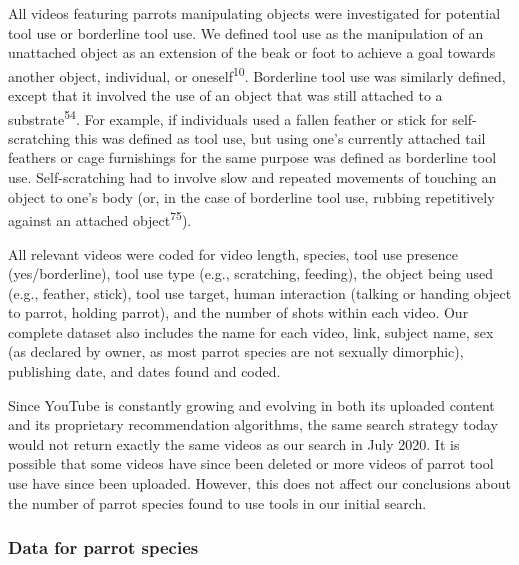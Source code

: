 \documentclass[
  man, donotrepeattitle,floatsintext]{apa6}
\begin{document}
All videos featuring parrots manipulating objects were investigated for
potential tool use or borderline tool use. We defined tool use as the
manipulation of an unattached object as an extension of the beak or foot to
achieve a goal towards another object, individual, or oneself\textsuperscript{10}.
Borderline tool use was similarly defined, except that it involved the use of an
object that was still attached to a substrate\textsuperscript{54}. For example, if
individuals used a fallen feather or stick for self-scratching this was defined
as tool use, but using one's currently attached tail feathers or cage
furnishings for the same purpose was defined as borderline tool use.
Self-scratching had to involve slow and repeated movements of touching an object
to one's body (or, in the case of borderline tool use, rubbing repetitively
against an attached object\textsuperscript{75}).

All relevant videos were coded for video length, species, tool use presence
(yes/borderline), tool use type (e.g., scratching, feeding), the object being
used (e.g., feather, stick), tool use target, human interaction
(talking or handing object to parrot, holding parrot), and the number of shots
within each video. Our complete dataset also includes the name for each video,
link, subject name, sex (as declared by owner, as most parrot species are not
sexually dimorphic), publishing date, and dates found and coded.

Since YouTube is constantly growing and evolving in both its uploaded content
and its proprietary recommendation algorithms, the same search strategy today
would not return exactly the same videos as our search in July 2020. It is
possible that some videos have since been deleted or more videos of parrot tool
use have since been uploaded. However, this does not affect our conclusions
about the number of parrot species found to use tools in our initial search.

\hypertarget{data-for-parrot-species}{%
\subsubsection{Data for parrot species}\label{data-for-parrot-species}}
\end{document}
